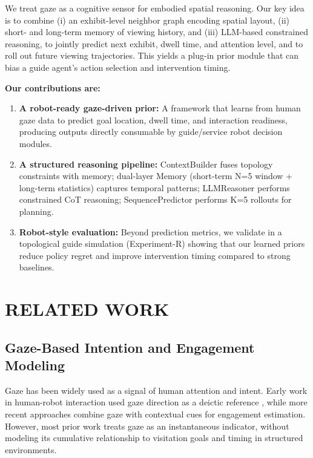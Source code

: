 \documentclass{letterpaper,article}
\begin{document}
We treat gaze as a cognitive sensor for embodied spatial reasoning. Our key idea is to combine (i) an exhibit-level neighbor graph encoding spatial layout, (ii) short- and long-term memory of viewing history, and (iii) LLM-based constrained reasoning, to jointly predict next exhibit, dwell time, and attention level, and to roll out future viewing trajectories. This yields a plug-in prior module that can bias a guide agent's action selection and intervention timing.

\textbf{Our contributions are:}

\begin{enumerate}
    \item \textbf{A robot-ready gaze-driven prior:} A framework that learns from human gaze data to predict goal location, dwell time, and interaction readiness, producing outputs directly consumable by guide/service robot decision modules.
    \item \textbf{A structured reasoning pipeline:} ContextBuilder fuses topology constraints with memory; dual-layer Memory (short-term N=5 window + long-term statistics) captures temporal patterns; LLMReasoner performs constrained CoT reasoning; SequencePredictor performs K=5 rollouts for planning.
    \item \textbf{Robot-style evaluation:} Beyond prediction metrics, we validate in a topological guide simulation (Experiment-R) showing that our learned priors reduce policy regret and improve intervention timing compared to strong baselines.
\end{enumerate}

\section{RELATED WORK}

\subsection{Gaze-Based Intention and Engagement Modeling}

Gaze has been widely used as a signal of human attention and intent. Early work in human-robot interaction used gaze direction as a deictic reference \cite{shon2015people}, while more recent approaches combine gaze with contextual cues for engagement estimation. However, most prior work treats gaze as an instantaneous indicator, without modeling its cumulative relationship to visitation goals and timing in structured environments.
\end{document}
